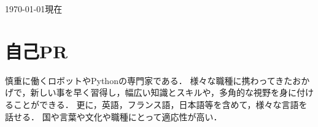 \documentclass[10pt, a4paper]{article}
\begin{document}
\thispagestyle{plain}

\hfill{\footnotesize \today 現在}

\section{自己PR}
慎重に働くロボットやPythonの専門家である．
様々な職種に携わってきたおかげで，新しい事を早く習得し，幅広い知識とスキルや，多角的な視野を身に付けることができる．
更に，英語，フランス語，日本語等を含めて，様々な言語を話せる．
国や言葉や文化や職種にとって適応性が高い．



\end{document}
